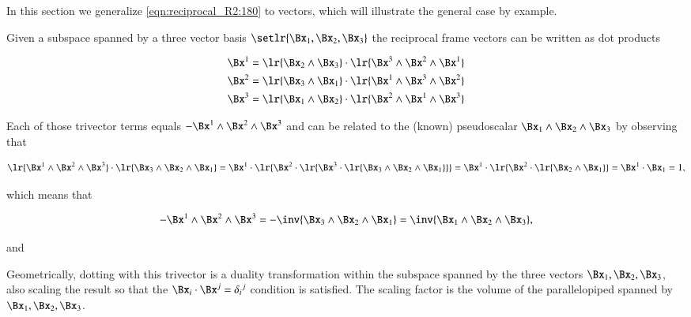 %
%

In this section we generalize \cref{eqn:reciprocal_R2:180} to  vectors, which will illustrate the general case by example.

Given
a subspace spanned by a three vector basis \( \setlr{ \Bx_1, \Bx_2, \Bx_3 } \) the reciprocal frame vectors can be written as dot products

\begin{dmath}\label{eqn:reciprocal_R3:320}
\begin{aligned}
\Bx^1 &= \lr{ \Bx_2 \wedge \Bx_3 } \cdot \lr{ \Bx^3 \wedge \Bx^2 \wedge \Bx^1 } \\
\Bx^2 &= \lr{ \Bx_3 \wedge \Bx_1 } \cdot \lr{ \Bx^1 \wedge \Bx^3 \wedge \Bx^2 } \\
\Bx^3 &= \lr{ \Bx_1 \wedge \Bx_2 } \cdot \lr{ \Bx^2 \wedge \Bx^1 \wedge \Bx^3 } \\
\end{aligned}
\end{dmath}

Each of those trivector terms equals \( - \Bx^1 \wedge \Bx^2 \wedge \Bx^3 \) and can be related to the (known) pseudoscalar \( \Bx_1 \wedge \Bx_2 \wedge \Bx_3 \) by observing that

\begin{dmath}\label{eqn:reciprocal_R3:340}
\lr{ \Bx^1 \wedge \Bx^2 \wedge \Bx^3 } \cdot \lr{ \Bx_3 \wedge \Bx_2 \wedge \Bx_1 }
=
\Bx^1 \cdot \lr{ \Bx^2 \cdot \lr{ \Bx^3 \cdot \lr{ \Bx_3 \wedge \Bx_2 \wedge \Bx_1 } }}
=
\Bx^1 \cdot \lr{ \Bx^2 \cdot \lr{ \Bx_2 \wedge \Bx_1 } }
=
\Bx^1 \cdot \Bx_1
=
1,
\end{dmath}

which means that

\begin{dmath}\label{eqn:reciprocal_R3:360}
-\Bx^1 \wedge \Bx^2 \wedge \Bx^3
= -\inv{ \Bx_3 \wedge \Bx_2 \wedge \Bx_1 }
= \inv{ \Bx_1 \wedge \Bx_2 \wedge \Bx_3 },
\end{dmath}

and


Geometrically, dotting with this trivector is a duality transformation within the subspace spanned by the three vectors \( \Bx_1, \Bx_2, \Bx_3 \), also scaling the result so that the \( \Bx_i \cdot \Bx^j = {\delta_i}^j \) condition is satisfied.  The scaling factor is the volume of the parallelopiped spanned by \( \Bx_1, \Bx_2, \Bx_3 \).

